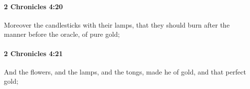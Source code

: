 		\paragraph{2 Chronicles 4:20} %
			\label{2CHRONICLES-4-20}

			Moreover the candlesticks with their lamps, that they should burn after the manner before the oracle, of pure gold;


		\paragraph{2 Chronicles 4:21} %
			\label{2CHRONICLES-4-21}

			And the flowers, and the lamps, and the tongs, made he of gold, and that perfect gold;


